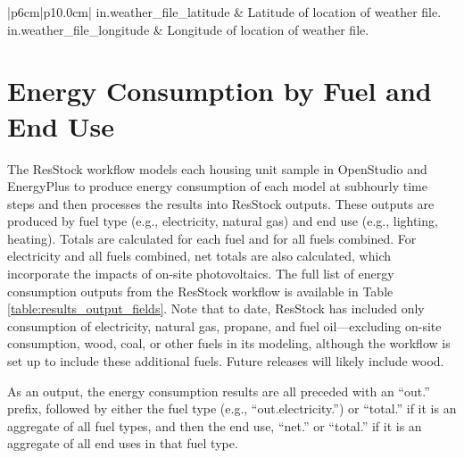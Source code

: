\begin{customLongTable}{ |p{6cm}|p{10.0cm}| }
        in.weather\_file\_latitude & Latitude of location of weather file. \\ \hline
        in.weather\_file\_longitude & Longitude of location of weather file. \\ \hline
    \end{customLongTable}

\section{Energy Consumption by Fuel and End Use}
The ResStock workflow models each housing unit sample in OpenStudio and EnergyPlus to produce energy consumption of each model at subhourly time steps and then processes the results into ResStock outputs. These outputs are produced by fuel type (e.g., electricity, natural gas) and end use (e.g., lighting, heating). Totals are calculated for each fuel and for all fuels combined. For electricity and all fuels combined, net totals are also calculated, which incorporate the impacts of on-site photovoltaics. The full list of energy consumption outputs from the ResStock workflow is available in Table \ref{table:results_output_fields}. Note that to date, ResStock has included only consumption of electricity, natural gas, propane, and fuel oil---excluding on-site consumption, wood, coal, or other fuels in its modeling, although the workflow is set up to include these additional fuels. Future releases will likely include wood. 

As an output, the energy consumption results are all preceded with an ``out.'' prefix, followed by either the fuel type (e.g., ``out.electricity.'') or ``total.'' if it is an aggregate of all fuel types, and then the end use, ``net.''  or ``total.'' if it is an aggregate of all end uses in that fuel type.


